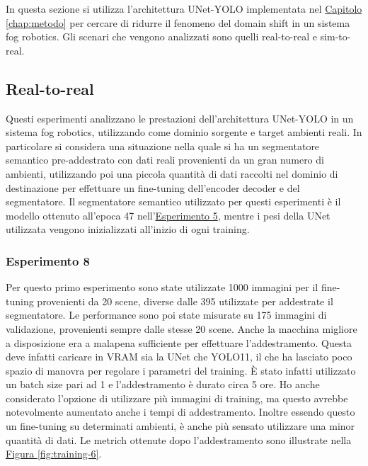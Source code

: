 \documentclass[12pt]{report}
\begin{document}
In questa sezione si utilizza l'architettura UNet-YOLO implementata nel \hyperref[chap:metodo]{Capitolo \ref{chap:metodo}} per cercare di ridurre il fenomeno del domain shift in un sistema fog robotics. Gli scenari che vengono analizzati sono quelli real-to-real e sim-to-real.

\subsection{Real-to-real}
\label{sec:real_to_real_fr}

Questi esperimenti analizzano le prestazioni dell'architettura UNet-YOLO in un sistema fog robotics, utilizzando come dominio sorgente e target ambienti reali. In particolare si considera una situazione nella quale si ha un segmentatore semantico pre-addestrato con dati reali provenienti da un gran numero di ambienti, utilizzando poi una piccola quantità di dati raccolti nel dominio di destinazione per effettuare un fine-tuning dell'encoder decoder e del segmentatore. Il segmentatore semantico utilizzato per questi esperimenti è il modello ottenuto all'epoca 47 nell'\hyperref[sec:esperimento_5]{Esperimento 5}, mentre i pesi della UNet utilizzata vengono inizializzati all'inizio di ogni training.

\subsubsection{Esperimento 8}
\label{sec:esperimento_8}

Per questo primo esperimento sono state utilizzate 1000 immagini per il fine-tuning provenienti da 20 scene, diverse dalle 395 utilizzate per addestrate il segmentatore. Le performance sono poi state misurate su 175 immagini di validazione, provenienti sempre dalle stesse 20 scene. Anche la macchina migliore a disposizione era a malapena sufficiente per effettuare l'addestramento. Questa deve infatti caricare in VRAM sia la UNet che YOLO11, il che ha lasciato poco spazio di manovra per regolare i parametri del training. È stato infatti utilizzato un batch size pari ad 1 e l'addestramento è durato circa 5 ore. Ho anche considerato l'opzione di utilizzare più immagini di training, ma questo avrebbe notevolmente aumentato anche i tempi di addestramento. Inoltre essendo questo un fine-tuning su determinati ambienti, è anche più sensato utilizzare una minor quantità di dati. Le metrich ottenute dopo l'addestramento sono illustrate nella \hyperref[fig:training-6]{Figura \ref{fig:training-6}}.
\end{document}
